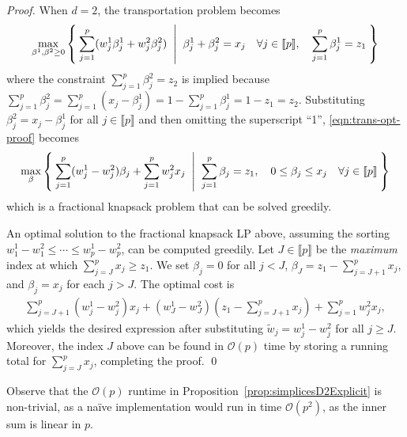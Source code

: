 \documentclass[smallextended]{svjour3}
\newcommand{\tw}{\widetilde{w}}
\begin{document}
\begin{proof}
When $d=2$, the transportation problem becomes
\begin{alignat}{2} \label{eqn:trans-opt-proof}
\max_{\beta^1,\beta^2 \geq 0}\Set{\sum_{j=1}^p(w^1_j\beta^1_j+w^2_j\beta^2_j)\;|\;\beta^1_j+\beta^2_j =x_j \quad\forall j\in\llbracket p\rrbracket,\quad \sum_{j=1}^p\beta^1_j =z_1}
\end{alignat}
where the constraint $\sum_{j=1}^p\beta^2_j=z_2$ is implied because
$\sum_{j=1}^p\beta^2_j=\sum_{j=1}^p(x_j-\beta^1_j)=1-\sum_{j=1}^p\beta^1_j=1-z_1=z_2$.
Substituting $\beta^2_j=x_j-\beta^1_j$ for all $j \in \llbracket p \rrbracket$ and then omitting the superscript ``1'', \eqref{eqn:trans-opt-proof} becomes
\begin{alignat*}{2}
\max_{\beta}\Set{\sum_{j=1}^p(w^1_j-w^2_j)\beta_j+\sum_{j=1}^pw^2_jx_j\;|\;\sum_{j=1}^p\beta_j =z_1,\quad  0\le\beta_j \le x_j \quad \forall j\in\llbracket p\rrbracket}
\end{alignat*}
which is a fractional knapsack problem that can be solved greedily.

An optimal solution to the fractional knapsack LP above, assuming the sorting $w^1_1-w^2_1\le\cdots\le w^1_p-w^2_p$, can be computed greedily. Let $J\in\llbracket p\rrbracket$ be the \textit{maximum} index at which $\sum_{j=J}^px_j\ge z_1$.
We set $\beta_j = 0$ for all $j < J$, $\beta_J = z_1 - \sum_{j=J+1}^p x_j$, and $\beta_j = x_j$ for each $j > J$.
The optimal cost is
\begin{align*}
\sum_{j=J+1}^p(w^1_j-w^2_j)x_j+(w^1_J-w^2_J)\left(z_1-\sum_{j=J+1}^px_j\right)+\sum_{j=1}^pw^2_jx_j,
\end{align*}
which yields the desired expression after substituting $\tw_j=w^1_j-w^2_j$ for all $j\ge J$.
Moreover, the index $J$ above can be found in $\mathcal{O}(p)$ time by storing a running total for $\sum_{j=J}^p x_j$, completing the proof.
\qed\end{proof}

Observe that the $\mathcal{O}(p)$ runtime in Proposition~\ref{prop:simplicesD2Explicit} is non-trivial, as a na\"{i}ve implementation would run in time $\mathcal{O}(p^2)$, as the inner sum is linear in $p$.
\end{document}
